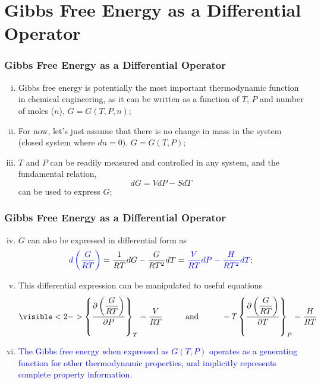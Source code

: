 \documentclass[10pt,compress,handout,unknownkeysallowed]{beamer}
\begin{document}
\section{Gibbs Free Energy as a Differential Operator}

\begin{frame}
  \frametitle{Gibbs Free Energy as a Differential Operator}
     \begin{enumerate}[i)]
        \item<1-> Gibbs free energy is potentially the most important thermodynamic function in chemical engineering, as it can be written as a function of $T$, $P$ and number of moles ($n$), \ie $G=G(T,P,n)$;
        \item<2-> For now, let's just assume that there is no change in mass in the system (\ie closed system where $dn=0$), $G=G(T,P)$;
        \item<3-> $T$ and $P$ can be readily measured and controlled in any system, and the fundamental relation, 
             \begin{displaymath}
                dG = VdP - SdT
              \end{displaymath}
              can be used to express $G$;
     \end{enumerate}

\end{frame}
\normalsize


\begin{frame}
  \frametitle{Gibbs Free Energy as a Differential Operator}
     \begin{enumerate}[i)]\setcounter{enumi}{3}
        \item<1-> $G$ can also be expressed in differential form as 
             \begin{displaymath}
                \textcolor{blue}{d\left(\displaystyle\frac{G}{RT}\right)} = \displaystyle\frac{1}{RT}dG - \displaystyle\frac{G}{RT^{2}}dT = \textcolor{blue}{\displaystyle\frac{V}{RT}dP - \displaystyle\frac{H}{RT^{2}}dT};
              \end{displaymath}
        \item<2-> This differential expression can be  manipulated to useful equations
              \begin{displaymath}
                  \visible<2->{\left\{ \frc{\partial\left(\frc{G}{RT}\right)}{\partial P}\right\}_{T} = \frc{V}{RT}   \hspace{1cm}\text{and}\hspace{1cm} -T\left\{ \frc{\partial\left(\frc{G}{RT}\right)}{\partial T}\right\}_{P} = \frc{H}{RT} }
              \end{displaymath}

        \item<3-> \textcolor{blue}{The Gibbs free energy when expressed as $G\left(T,P\right)$ operates as a generating function for other thermodynamic properties, and implicitly represents complete property information.}
     \end{enumerate}

\end{frame}
\normalsize
\end{document}
